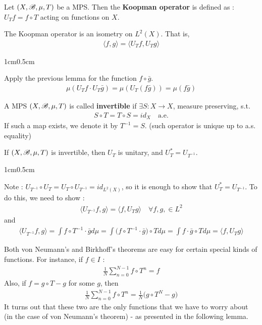 \documentclass[10pt,a4paper]{report}
\newenvironment{proof}
{\begin{changemargin}{1cm}{0.5cm} 
	}%
	{\end{changemargin}
}
\begin{document}
 Let $(X,\mathscr{B}, \mu, T)$ be a MPS. Then the \textbf{Koopman operator} is defined as : $U_T f = f\circ T$ acting on functions on $X$.
\s

\lem The Koopman operator is an isometry on $L^2(X)$. That is,
\begin{align*}
\langle f,g\rangle = \langle U_T f, U_T g \rangle
\end{align*}
\begin{proof}
\pf Apply the previous lemma for the function $f\circ \bar{g}$.
\begin{align*}
\mu(U_T f \cdot U_T \bar{g}) = \mu(U_T(f\bar{g})) = \mu(f\bar{g})
\end{align*}

\eop
\end{proof}
\s

 A MPS $(X,\mathscr{B}, \mu, T)$ is called \textbf{invertible} if $\exists S:X\rightarrow X$, measure preserving, s.t.
\begin{align*}
S\circ T = T\circ S= id_X \quad \text{a.e.}
\end{align*}
If such a map exists, we denote it by $T^{-1} = S$. (such operator is unique up to a.s. equality)
\s

\lem If $(X,\mathscr{B}, \mu, T)$ is invertible, then $U_T$ is unitary, and $U^*_T = U_{T^{-1}}$.

\begin{proof}
\pf Note : $U_{T^{-1}} \circ U_T = U_T \circ U_{T^{-1}} = id_{L^2(X)}$, so it is enough to show that $U^*_T = U_{T^{-1}}$. To do this, we need to show :
\begin{align*}
\langle U_{T^{-1}} f, g\rangle = \langle f, U_T g\rangle \quad \forall f,g, \in L^2
\end{align*}
and
\begin{align*}
\langle U_{T^{-1}} f, g\rangle = \int f\circ T^{-1} \cdot \bar{g} d\mu = \int \Big( f\circ T^{-1} \cdot \bar{g}  \Big) \circ T d\mu = \int f\cdot \bar{g} \circ T d\mu = \langle f, U_T g\rangle
\end{align*}

\eop
\end{proof}
\s

\quad Both von Neumann's and Birkhoff's theorems are easy for certain special kinds of functions. For instance, if $f\in I$ :
\begin{align*}
\frac{1}{N} \sum_{n=0}^{N-1} f\circ T^n =f
\end{align*}
Also, if $f= g \circ T -g$ for some $g$, then
\begin{align*}
\frac{1}{N} \sum_{n=0}^{N-1} f\circ T^n = \frac{1}{N}\big( g\circ T^N - g \big)
\end{align*}
It turns out that these two are the only functions that we have to worry about (in the case of von Neumann's theorem) - as presented in the following lemma.
\s
\end{document}
